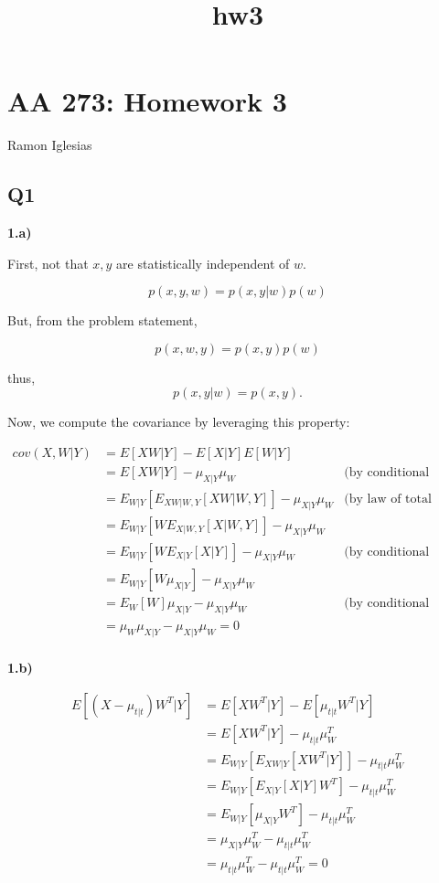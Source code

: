 \documentclass[11pt]{article}
\title{hw3}
\begin{document}
    
    
    \maketitle
    
    

    
    \section{AA 273: Homework 3}\label{aa-273-homework-3}

Ramon Iglesias

    \subsection{Q1}\label{q1}

\textbf{1.a)}

First, not that \(x,y\) are statistically independent of \(w\).

\[
p(x,y,w) = p(x,y | w) p(w)
\]

But, from the problem statement,

\[ 
p(x,w,y) = p(x,y) p(w)
\]

thus, \[
p(x,y | w)  = p(x,y).
\]

Now, we compute the covariance by leveraging this property:

\begin{align}
cov(X,W | Y)  & = E[XW | Y] - E[X | Y] E[W|Y] &\\
 &= E[XW | Y] - \mu_{X|Y} \mu_{W} & \text{(by conditional independence)}\\
 &= E_{W | Y}[E_{XW | W,Y}[XW | W,Y] ] - \mu_{X|Y} \mu_{W}  & \text{(by law of total expectation)}\\
 &= E_{W | Y}[W E_{X | W,Y}[X | W,Y] ] - \mu_{X|Y} \mu_{W}& \\
 &= E_{W | Y}[W E_{X | Y}[X | Y] ] - \mu_{X|Y} \mu_{W} & \text{(by conditional independence)}\\
 &= E_{W | Y}[W \mu_{X|Y}] - \mu_{X|Y} \mu_{W} &\\
 &= E_{W}[W] \mu_{X|Y} - \mu_{X|Y} \mu_{W}  & \text{(by conditional independence)}\\
 &= \mu_{W} \mu_{X|Y} - \mu_{X|Y} \mu_{W} = 0 &\\
 \end{align}

    \textbf{1.b)}

\begin{align}
E[(X - \mu_{t|t}) W^T | Y] & = E[XW^T | Y] - E[\mu_{t|t} W^T | Y]\\
&= E[XW^T | Y] - \mu_{t|t} \mu_{W}^T \\
&= E_{W|Y} [ E_{XW | Y}[ XW^T | Y] ] - \mu_{t|t} \mu_{W}^T \\
&= E_{W|Y} [ E_{X | Y}[ X | Y] W^T ] - \mu_{t|t} \mu_{W}^T \\
&= E_{W|Y} [ \mu_{X|Y} W^T ] - \mu_{t|t} \mu_{W}^T \\
&= \mu_{X|Y} \mu_{W}^T  - \mu_{t|t} \mu_{W}^T \\
&= \mu_{t|t} \mu_{W}^T  - \mu_{t|t} \mu_{W}^T = 0 \\
\end{align}
\end{document}
